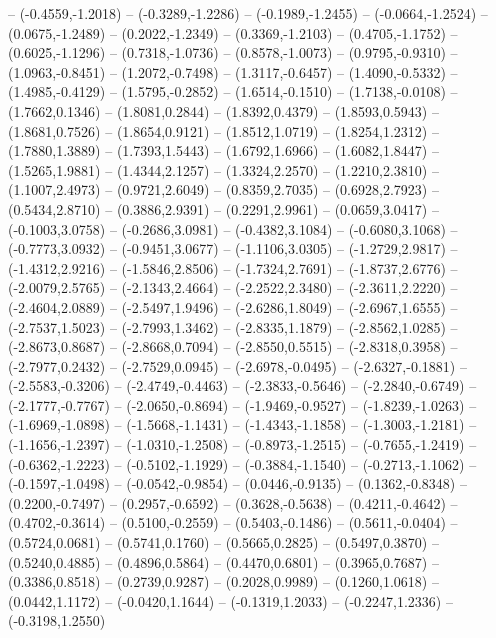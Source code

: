 {	-- (-0.4559,-1.2018)
	-- (-0.3289,-1.2286)
	-- (-0.1989,-1.2455)
	-- (-0.0664,-1.2524)
	-- (0.0675,-1.2489)
	-- (0.2022,-1.2349)
	-- (0.3369,-1.2103)
	-- (0.4705,-1.1752)
	-- (0.6025,-1.1296)
	-- (0.7318,-1.0736)
	-- (0.8578,-1.0073)
	-- (0.9795,-0.9310)
	-- (1.0963,-0.8451)
	-- (1.2072,-0.7498)
	-- (1.3117,-0.6457)
	-- (1.4090,-0.5332)
	-- (1.4985,-0.4129)
	-- (1.5795,-0.2852)
	-- (1.6514,-0.1510)
	-- (1.7138,-0.0108)
	-- (1.7662,0.1346)
	-- (1.8081,0.2844)
	-- (1.8392,0.4379)
	-- (1.8593,0.5943)
	-- (1.8681,0.7526)
	-- (1.8654,0.9121)
	-- (1.8512,1.0719)
	-- (1.8254,1.2312)
	-- (1.7880,1.3889)
	-- (1.7393,1.5443)
	-- (1.6792,1.6966)
	-- (1.6082,1.8447)
	-- (1.5265,1.9881)
	-- (1.4344,2.1257)
	-- (1.3324,2.2570)
	-- (1.2210,2.3810)
	-- (1.1007,2.4973)
	-- (0.9721,2.6049)
	-- (0.8359,2.7035)
	-- (0.6928,2.7923)
	-- (0.5434,2.8710)
	-- (0.3886,2.9391)
	-- (0.2291,2.9961)
	-- (0.0659,3.0417)
	-- (-0.1003,3.0758)
	-- (-0.2686,3.0981)
	-- (-0.4382,3.1084)
	-- (-0.6080,3.1068)
	-- (-0.7773,3.0932)
	-- (-0.9451,3.0677)
	-- (-1.1106,3.0305)
	-- (-1.2729,2.9817)
	-- (-1.4312,2.9216)
	-- (-1.5846,2.8506)
	-- (-1.7324,2.7691)
	-- (-1.8737,2.6776)
	-- (-2.0079,2.5765)
	-- (-2.1343,2.4664)
	-- (-2.2522,2.3480)
	-- (-2.3611,2.2220)
	-- (-2.4604,2.0889)
	-- (-2.5497,1.9496)
	-- (-2.6286,1.8049)
	-- (-2.6967,1.6555)
	-- (-2.7537,1.5023)
	-- (-2.7993,1.3462)
	-- (-2.8335,1.1879)
	-- (-2.8562,1.0285)
	-- (-2.8673,0.8687)
	-- (-2.8668,0.7094)
	-- (-2.8550,0.5515)
	-- (-2.8318,0.3958)
	-- (-2.7977,0.2432)
	-- (-2.7529,0.0945)
	-- (-2.6978,-0.0495)
	-- (-2.6327,-0.1881)
	-- (-2.5583,-0.3206)
	-- (-2.4749,-0.4463)
	-- (-2.3833,-0.5646)
	-- (-2.2840,-0.6749)
	-- (-2.1777,-0.7767)
	-- (-2.0650,-0.8694)
	-- (-1.9469,-0.9527)
	-- (-1.8239,-1.0263)
	-- (-1.6969,-1.0898)
	-- (-1.5668,-1.1431)
	-- (-1.4343,-1.1858)
	-- (-1.3003,-1.2181)
	-- (-1.1656,-1.2397)
	-- (-1.0310,-1.2508)
	-- (-0.8973,-1.2515)
	-- (-0.7655,-1.2419)
	-- (-0.6362,-1.2223)
	-- (-0.5102,-1.1929)
	-- (-0.3884,-1.1540)
	-- (-0.2713,-1.1062)
	-- (-0.1597,-1.0498)
	-- (-0.0542,-0.9854)
	-- (0.0446,-0.9135)
	-- (0.1362,-0.8348)
	-- (0.2200,-0.7497)
	-- (0.2957,-0.6592)
	-- (0.3628,-0.5638)
	-- (0.4211,-0.4642)
	-- (0.4702,-0.3614)
	-- (0.5100,-0.2559)
	-- (0.5403,-0.1486)
	-- (0.5611,-0.0404)
	-- (0.5724,0.0681)
	-- (0.5741,0.1760)
	-- (0.5665,0.2825)
	-- (0.5497,0.3870)
	-- (0.5240,0.4885)
	-- (0.4896,0.5864)
	-- (0.4470,0.6801)
	-- (0.3965,0.7687)
	-- (0.3386,0.8518)
	-- (0.2739,0.9287)
	-- (0.2028,0.9989)
	-- (0.1260,1.0618)
	-- (0.0442,1.1172)
	-- (-0.0420,1.1644)
	-- (-0.1319,1.2033)
	-- (-0.2247,1.2336)
	-- (-0.3198,1.2550)
}
